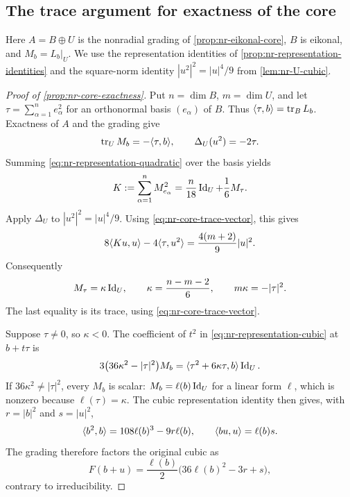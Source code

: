 \subsection{The trace argument for exactness of the core}
\label{app:nr-core-exactness-proof}

Here $A=B\oplus U$ is the nonradial grading of
\cref{prop:nr-eikonal-core}, $B$ is eikonal, and $M_b=L_b|_U$.
We use the representation identities of
\cref{prop:nr-representation-identities} and the square-norm identity
$|u^2|^2=|u|^4/9$ from \cref{lem:nr-U-cubic}.

\begin{proof}[Proof of \cref{prop:nr-core-exactness}]
Put $n=\dim B$, $m=\dim U$, and let
$\tau=\sum_{\alpha=1}^n e_\alpha^2$ for an orthonormal basis
$(e_\alpha)$ of $B$.
Thus $\langle \tau,b\rangle=\operatorname{tr}_B L_b$.
Exactness of $A$ and the grading give
\begin{equation}\label{eq:nr-core-trace-vector}
 \operatorname{tr}_U M_b=-\langle \tau,b\rangle,\qquad
 \Delta_U(u^2)=-2\tau.
\end{equation}
Summing \eqref{eq:nr-representation-quadratic} over the basis yields
\[
 K:=\sum_{\alpha=1}^n M_{e_\alpha}^2
     =\frac n{18}\operatorname{Id}_U+\frac16M_\tau.
\]
Apply $\Delta_U$ to $|u^2|^2=|u|^4/9$. Using
\eqref{eq:nr-core-trace-vector}, this gives
\[
 8\langle Ku,u\rangle-4\langle \tau,u^2\rangle
       =\frac{4(m+2)}9|u|^2.
\]
Consequently
\begin{equation}\label{eq:nr-core-scalar-trace-action}
 M_\tau=\kappa\operatorname{Id}_U,\qquad
 \kappa=\frac{n-m-2}{6},\qquad
 m\kappa=-|\tau|^2.
\end{equation}
The last equality is its trace, using
\eqref{eq:nr-core-trace-vector}.

Suppose $\tau\ne0$, so $\kappa<0$.
The coefficient of $t^2$ in \eqref{eq:nr-representation-cubic}
at $b+t\tau$ is
\begin{equation}\label{eq:nr-core-trace-dichotomy}
 3\bigl(36\kappa^2-|\tau|^2\bigr)M_b
      =\langle \tau^2+6\kappa\tau,b\rangle\operatorname{Id}_U.
\end{equation}
If $36\kappa^2\ne|\tau|^2$, every $M_b$ is scalar:
$M_b=\ell(b)\operatorname{Id}_U$ for a linear form $\ell$,
which is nonzero because $\ell(\tau)=\kappa$.
The cubic representation identity then gives, with $r=|b|^2$ and
$s=|u|^2$,
\[
 \langle b^2,b\rangle=108\ell(b)^3-9r\ell(b),\qquad
 \langle bu,u\rangle=\ell(b)s.
\]
The grading therefore factors the original cubic as
\[
 F(b+u)=\frac{\ell(b)}2\bigl(36\ell(b)^2-3r+s\bigr),
\]
contrary to irreducibility.


\end{proof}
